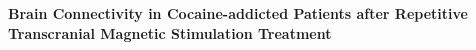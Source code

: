 \begin{center}
    \large\textbf{Brain Connectivity in Cocaine-addicted Patients after Repetitive Transcranial Magnetic Stimulation Treatment}
\end{center}
\begin{quotation}
    \noindent
    \blindtext
\end{quotation}
\clearpage
{}

